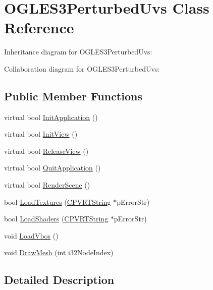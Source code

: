\hypertarget{class_o_g_l_e_s3_perturbed_uvs}{\section{O\+G\+L\+E\+S3\+Perturbed\+Uvs Class Reference}
\label{class_o_g_l_e_s3_perturbed_uvs}
}


Inheritance diagram for O\+G\+L\+E\+S3\+Perturbed\+Uvs\+:


Collaboration diagram for O\+G\+L\+E\+S3\+Perturbed\+Uvs\+:
\subsection*{Public Member Functions}
\begin{DoxyCompactItemize}
\item 
virtual bool \hyperlink{class_o_g_l_e_s3_perturbed_uvs_ae35756da42d0d48a6c5054ece66ae4ec}{Init\+Application} ()
\item 
virtual bool \hyperlink{class_o_g_l_e_s3_perturbed_uvs_a52cfcdd520d4741c97d4c60b5ff31bac}{Init\+View} ()
\item 
virtual bool \hyperlink{class_o_g_l_e_s3_perturbed_uvs_a073f42af8f9985176c7e2ab2ef84d4f3}{Release\+View} ()
\item 
virtual bool \hyperlink{class_o_g_l_e_s3_perturbed_uvs_a9aa05832ec7f325a820ce810ba2def55}{Quit\+Application} ()
\item 
virtual bool \hyperlink{class_o_g_l_e_s3_perturbed_uvs_ab5a1b2948b4f2da98c71f91dfae23d84}{Render\+Scene} ()
\item 
bool \hyperlink{class_o_g_l_e_s3_perturbed_uvs_ac07032e54787ec1d8854b3e5a1b9242d}{Load\+Textures} (\hyperlink{class_c_p_v_r_t_string}{C\+P\+V\+R\+T\+String} $\ast$p\+Error\+Str)
\item 
bool \hyperlink{class_o_g_l_e_s3_perturbed_uvs_a2fb80323be5a2ec479e4adabc4cdc254}{Load\+Shaders} (\hyperlink{class_c_p_v_r_t_string}{C\+P\+V\+R\+T\+String} $\ast$p\+Error\+Str)
\item 
void \hyperlink{class_o_g_l_e_s3_perturbed_uvs_a145ac0cb7b1b7b0f1bbe4a98ea6b961d}{Load\+Vbos} ()
\item 
void \hyperlink{class_o_g_l_e_s3_perturbed_uvs_a5863640f9c5f8fe0f345895f6d2030f8}{Draw\+Mesh} (int i32\+Node\+Index)
\end{DoxyCompactItemize}


\subsection{Detailed Description}


